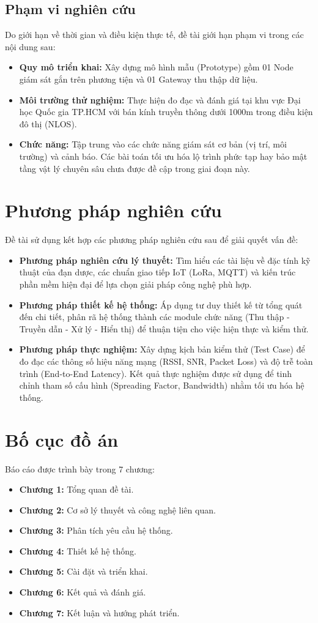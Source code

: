 \subsection{Phạm vi nghiên cứu}
Do giới hạn về thời gian và điều kiện thực tế, đề tài giới hạn phạm vi trong các nội dung sau:
\begin{itemize}
    \item \textbf{Quy mô triển khai:} Xây dựng mô hình mẫu (Prototype) gồm 01 Node giám sát gắn trên phương tiện và 01 Gateway thu thập dữ liệu.
    \item \textbf{Môi trường thử nghiệm:} Thực hiện đo đạc và đánh giá tại khu vực Đại học Quốc gia TP.HCM với bán kính truyền thông dưới 1000m trong điều kiện đô thị (NLOS).
    \item \textbf{Chức năng:} Tập trung vào các chức năng giám sát cơ bản (vị trí, môi trường) và cảnh báo. Các bài toán tối ưu hóa lộ trình phức tạp hay bảo mật tầng vật lý chuyên sâu chưa được đề cập trong giai đoạn này.
\end{itemize}

\section{Phương pháp nghiên cứu}
Đề tài sử dụng kết hợp các phương pháp nghiên cứu sau để giải quyết vấn đề:
\begin{itemize}
    \item \textbf{Phương pháp nghiên cứu lý thuyết:} Tìm hiểu các tài liệu về đặc tính kỹ thuật của đạn dược, các chuẩn giao tiếp IoT (LoRa, MQTT) và kiến trúc phần mềm hiện đại để lựa chọn giải pháp công nghệ phù hợp.
    \item \textbf{Phương pháp thiết kế hệ thống:} Áp dụng tư duy thiết kế từ tổng quát đến chi tiết, phân rã hệ thống thành các module chức năng (Thu thập - Truyền dẫn - Xử lý - Hiển thị) để thuận tiện cho việc hiện thực và kiểm thử.
    \item \textbf{Phương pháp thực nghiệm:} Xây dựng kịch bản kiểm thử (Test Case) để đo đạc các thông số hiệu năng mạng (RSSI, SNR, Packet Loss) và độ trễ toàn trình (End-to-End Latency). Kết quả thực nghiệm được sử dụng để tinh chỉnh tham số cấu hình (Spreading Factor, Bandwidth) nhằm tối ưu hóa hệ thống.
\end{itemize}

\section{Bố cục đồ án}
Báo cáo được trình bày trong 7 chương:
\begin{itemize}
    \item \textbf{Chương 1:} Tổng quan đề tài.
    \item \textbf{Chương 2:} Cơ sở lý thuyết và công nghệ liên quan.
    \item \textbf{Chương 3:} Phân tích yêu cầu hệ thống.
    \item \textbf{Chương 4:} Thiết kế hệ thống.
    \item \textbf{Chương 5:} Cài đặt và triển khai.
    \item \textbf{Chương 6:} Kết quả và đánh giá.
    \item \textbf{Chương 7:} Kết luận và hướng phát triển.
\end{itemize}